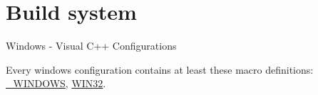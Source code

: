 \chapter{Build system\label{cha:buildsystem}}
\begin{section}{Windows - Visual C++ Configurations}

\newlength{\cdspcfgheading}
\setlength{\cdspcfgheading}{30mm}
\newlength{\cdspcfgtext}
\setlength{\cdspcfgtext}{\textwidth}
\addtolength{\cdspcfgtext}{-\cdspcfgheading}
\addtolength{\cdspcfgtext}{-\tabcolsep}
\addtolength{\cdspcfgtext}{-\tabcolsep}

\newcommand{\begindspconfigs}[1]{
	\begin{subsection}{#1}
	\begin{longtable}{p{\cdspcfgheading}@{}p{\cdspcfgtext}}
}
\newcommand{\adddspconfig}[4]{\hypertarget{cfg:#1}{}\\*
	\multicolumn{2}{l}{\textbf{#1}}\\*
	\textit{Target:}&#2\\*
	\textit{Description:}&#3\\*
	\textit{Defines used:}&#4\\
}
\newcommand{\termdspconfigs}[0]{
	\end{longtable}
	\end{subsection}
}

Every windows configuration contains at least these macro definitions: \hyperlink{def:_WINDOWS}{\_WINDOWS}, \hyperlink{def:WIN32}{WIN32}.


\end{section}
